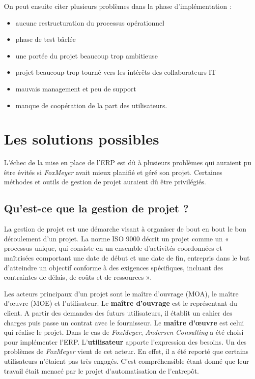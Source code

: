 \documentclass[12pt]{report}
\begin{document}
On peut ensuite citer plusieurs problèmes dans la phase d’implémentation :
\begin{itemize}
\item aucune restructuration du processus opérationnel
\item phase de test bâclée
\item une portée du projet beaucoup trop ambitieuse
\item projet beaucoup trop tourné vers les intérêts des collaborateurs IT
\item mauvais management et peu de support
\item manque de coopération de la part des utilisateurs\cite{zimmerfoxmeyer}.
\end{itemize}

\section{Les solutions possibles}

L'échec de la mise en place de l'ERP est dû à plusieurs problèmes qui auraient pu être évités si \textit{FoxMeyer} avait mieux planifié et géré son projet. Certaines méthodes et outils de gestion de projet auraient dû être privilégiés.

\subsection{Qu'est-ce que la gestion de projet ?}

La gestion de projet est une démarche visant à organiser de bout en bout le bon déroulement d'un projet.
La norme ISO 9000 décrit un projet comme un « processus unique, qui consiste en un ensemble d'activités coordonnées et maîtrisées comportant une date de début et une date de fin, entrepris dans le but d'atteindre un objectif conforme à des 
exigences spécifiques, incluant des contraintes de délais, de coûts et de ressources »\cite{wikigestion}.

Les acteurs principaux d'un projet sont le maître d'ouvrage (MOA), le maître d’œuvre (MOE) et l'utilisateur.
Le \textbf{maître d'ouvrage} est le représentant du client. A partir des demandes des futurs utilisateurs, il établit un cahier des charges puis passe un contrat avec le fournisseur.
Le \textbf{maître d’œuvre} est celui qui réalise le projet. Dans le cas de \textit{FoxMeyer}, \textit{Andersen Consulting} a été choisi pour implémenter l'ERP.
L'\textbf{utilisateur} apporte l'expression des besoins. Un des problèmes de \textit{FoxMeyer} vient de cet acteur. En effet, il a été reporté que certains utilisateurs n'étaient pas très engagés. C'est compréhensible étant donné que leur travail était menacé par le projet d'automatisation de l'entrepôt\cite{zimmerfoxmeyer}.
\end{document}
